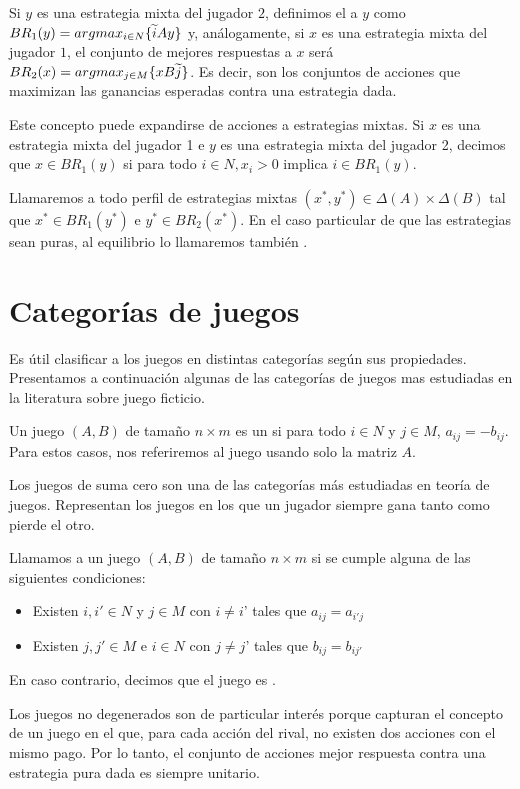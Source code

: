 Si $y$ es una estrategia mixta del jugador $2$, definimos el  a $y$ como $BR_1(y) = argmax_{i \in N}\{\widetilde{i}Ay\}$ y, análogamente, si $x$ es una estrategia mixta del jugador $1$, el conjunto de mejores respuestas a $x$ será $BR_2(x) = argmax_{j \in M}\{xB\widetilde{j}\}$. Es decir, son los conjuntos de acciones que maximizan las ganancias esperadas contra una estrategia dada.

Este concepto puede expandirse de acciones a estrategias mixtas. Si $x$ es una estrategia mixta del jugador 1 e $y$ es una estrategia mixta del jugador 2, decimos que $x \in BR_1(y)$ si para todo $i \in N, x_i > 0$ implica $i \in BR_1(y)$.

Llamaremos  a todo perfil de estrategias mixtas $(x^*, y^*) \in \Delta(A) \times \Delta(B)$ tal que $x^* \in BR_1(y^*)$ e $y^* \in BR_2(x^*)$. En el caso particular de que las estrategias sean puras, al equilibrio lo llamaremos también .

\section{Categorías de juegos}

Es útil clasificar a los juegos en distintas categorías según sus propiedades. Presentamos a continuación algunas de las categorías de juegos mas estudiadas en la literatura sobre juego ficticio.

\begin{definition}
    Un juego $(A, B)$ de tamaño $n \times m$ es un  si para todo $i \in N$ y $j \in M$, $ a_{ij} = -b_{ij}$. Para estos casos, nos referiremos al juego usando solo la matriz $A$.
\end{definition}

Los juegos de suma cero son una de las categorías más estudiadas en teoría de juegos. Representan los juegos en los que un jugador siempre gana tanto como pierde el otro.

\begin{definition}
    Llamamos  a un juego $(A, B)$ de tamaño $n \times m$ si se cumple alguna de las siguientes condiciones:
    \begin{itemize}
        \item Existen $i, i' \in N$ y $j \in M$ con $i \neq i$' tales que $a_{ij} = a_{i'j}$
        \item Existen $j, j' \in M$ e $i \in N$ con $j \neq j$' tales que $b_{ij} = b_{ij'}$
    \end{itemize}
    En caso contrario, decimos que el juego es .
\end{definition}
Los juegos no degenerados son de particular interés porque capturan el concepto de un juego en el que, para cada acción del rival, no existen dos acciones con el mismo pago. Por lo tanto, el conjunto de acciones mejor respuesta contra una estrategia pura dada es siempre unitario.

